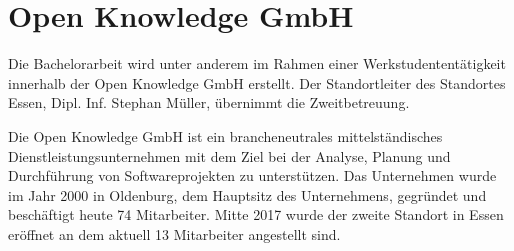 




\section{Open Knowledge GmbH}


Die Bachelorarbeit wird unter anderem im Rahmen einer Werkstudententätigkeit innerhalb der Open Knowledge GmbH erstellt. Der Standortleiter des Standortes Essen, Dipl. Inf. Stephan Müller, übernimmt die Zweitbetreuung.

Die Open Knowledge GmbH ist ein brancheneutrales mittelständisches Dienstleistungsunternehmen mit dem Ziel bei der Analyse, Planung und Durchführung von Softwareprojekten zu unterstützen. Das Unternehmen wurde im Jahr 2000 in Oldenburg, dem Hauptsitz des Unternehmens, gegründet und beschäftigt heute 74 Mitarbeiter. Mitte 2017 wurde der zweite Standort in Essen eröffnet an dem aktuell 13 Mitarbeiter angestellt sind.

